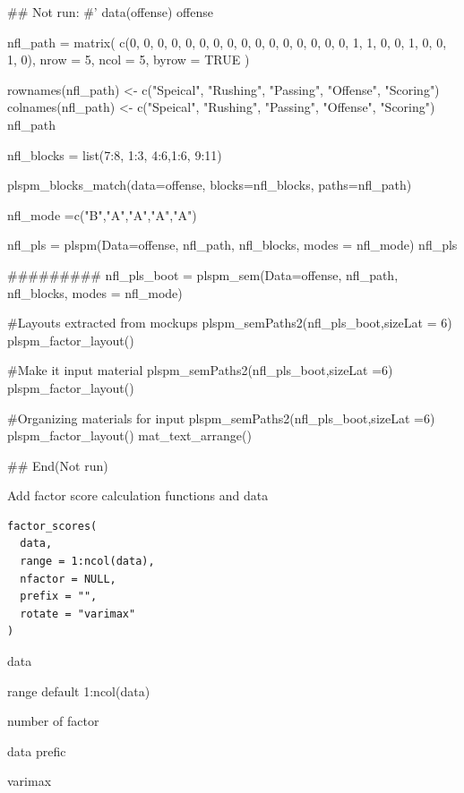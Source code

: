 \documentclass[a4paper]{book}
\begin{document}
\begin{Examples}
\begin{ExampleCode}

\#\# Not run: 
#'
data(offense)
offense %

nfl_path = matrix(
  c(0, 0, 0, 0, 0,
    0, 0, 0, 0, 0,
    0, 0, 0, 0, 0,
    0, 1, 1, 0, 0,
    1, 0, 0, 1, 0),
  nrow = 5, ncol = 5, byrow = TRUE )

rownames(nfl_path) <- c("Speical", "Rushing", "Passing", "Offense", "Scoring")
colnames(nfl_path) <- c("Speical", "Rushing", "Passing", "Offense", "Scoring")
nfl_path

nfl_blocks = list(7:8, 1:3, 4:6,1:6, 9:11)

plspm_blocks_match(data=offense, blocks=nfl_blocks,
                   paths=nfl_path)

nfl_mode =c("B","A","A","A","A")

nfl_pls = plspm(Data=offense, nfl_path, nfl_blocks, modes = nfl_mode)
nfl_pls%

#########
nfl_pls_boot = plspm_sem(Data=offense, nfl_path, nfl_blocks, modes = nfl_mode)

#Layouts extracted from mockups
plspm_semPaths2(nfl_pls_boot,sizeLat = 6)%
  plspm_factor_layout()

#Make it input material
plspm_semPaths2(nfl_pls_boot,sizeLat =6)%
  plspm_factor_layout() %

#Organizing materials for input
plspm_semPaths2(nfl_pls_boot,sizeLat =6)%
  plspm_factor_layout() %
  mat_text_arrange()

## End(Not run)



\end{ExampleCode}
\end{Examples}
%
\begin{Description}
Add factor score calculation functions and data
\end{Description}
%
\begin{Usage}
\begin{verbatim}
factor_scores(
  data,
  range = 1:ncol(data),
  nfactor = NULL,
  prefix = "",
  rotate = "varimax"
)
\end{verbatim}
\end{Usage}
%
\begin{Arguments}
\begin{ldescription}
\item[\code{data}] data

\item[\code{range}] range default 1:ncol(data)

\item[\code{nfactor}] number of factor

\item[\code{prefix}] data prefic

\item[\code{rotate}] varimax
\end{ldescription}
\end{Arguments}
\end{document}
